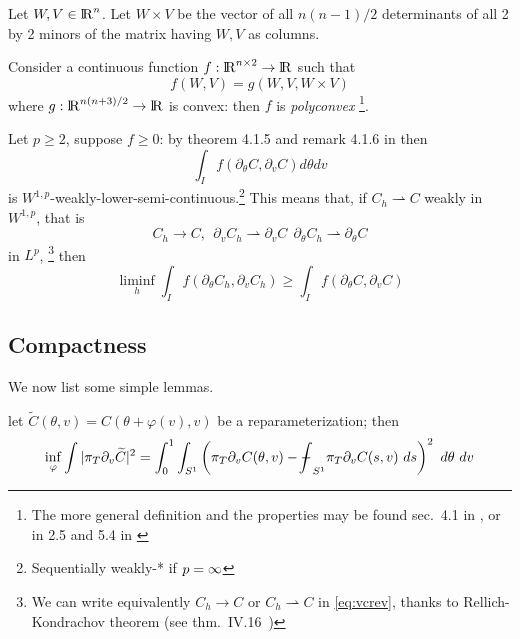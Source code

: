 \documentclass[twoside,a4paper,english]{article}
\def\derpar#1{\partial_{#1}}
\newcommand\lint{{\protect\mathrm{-\hskip-1.1em \int}}}
\def\wto{\rightharpoonup}
\begin{document}
\begin{Proposition}\label{polyconvex}
  Let $W,V\in{\protect\mathrm{l\hskip-0.15em R}}^n$.  Let $W\times V$ be the vector of all $n(n-1)/2$
  determinants of all 2 by 2 minors of the matrix having $W,V$ as
  columns.

  Consider a continuous function 
  $f:{\protect\mathrm{l\hskip-0.15em R}}^{n\times 2}\to{\protect\mathrm{l\hskip-0.15em R}}$ such that
  \[f(W,V)=g(W,V,W\times V)\]
  where   $g:{\protect\mathrm{l\hskip-0.15em R}}^{n(n+3)/2}\to{\protect\mathrm{l\hskip-0.15em R}}$ is convex: then $f$ is \emph{polyconvex}
  \footnote{The more general definition and the properties may be found 
    sec.\ 4.1 in \cite{buttazzo89:semic}, or
  in 2.5 and 5.4 in \cite{dacorogna:weak}}. 

  Let $p\ge 2$, suppose $f\ge 0$:
  by theorem 4.1.5 and remark 4.1.6 in \cite{buttazzo89:semic}
  then 
  \[ \int_I f(\derpar \theta C,\derpar v C) d\theta dv \]
  is $W^{1,p}$-weakly-lower-semi-continuous.\footnote{Sequentially 
    weakly-* if  $p=\infty$}
  This means that,
  if  $ C_h\wto C$ weakly in $W^{1,p}$, that is
  \begin{equation}
    C_h\to C, ~~\derpar v C_h \wto  \derpar v C ~~
    \derpar \theta C_h \wto  \derpar \theta C\label{eq:vcrev}
  \end{equation}
  in $L^p$, 
  \footnote{We can write equivalently $C_h\to C$ or  $C_h\wto C$
    in \eqref{eq:vcrev}, thanks to
    Rellich-Kondrachov theorem (see thm.\ IV.16\ \cite{Brezis})}
  then     
  \[ \liminf_h \int_I f(\derpar \theta C_h,\derpar vC_h)
  \ge    \int_I f(\derpar \theta C,\derpar v C)  \] 
\end{Proposition}

\subsection{Compactness}
\label{sec: compactness}


We now list some simple lemmas.

\begin{Lemma} \label{prop: pi T con media}
  let $\widetilde C(\theta,v) =C(\theta+\varphi(v),v)$ be 
  a reparameterization;  then
  \begin{equation}
    \inf_\varphi \int |\pi_T \derpar v \widetilde C|^2=
    \int_0^1 \int_{S^1}\left ( \pi_T \derpar v  C (\theta,v)
      - \lint_{S^1} \pi_T \derpar v C (s,v)~ds
    \right)^2~d\theta~dv
    \label{eq: pi T con media}  
  \end{equation}
\end{Lemma}
\end{document}
